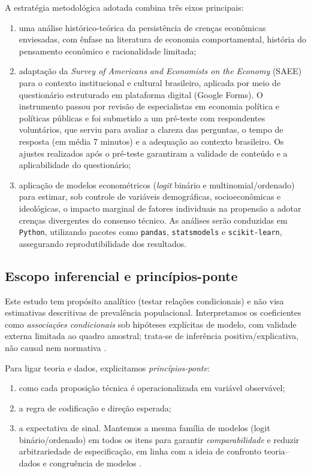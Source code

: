 A estratégia metodológica adotada combina três eixos principais:
\begin{enumerate}[label=\alph*)]
    \item uma análise histórico-teórica da persistência de crenças econômicas enviesadas, com ênfase na literatura de economia comportamental, história do pensamento econômico e racionalidade limitada;
    \item adaptação da \textit{Survey of Americans and Economists on the Economy} (SAEE) para o contexto institucional e cultural brasileiro, aplicada por meio de questionário estruturado em plataforma digital (Google Forms). O instrumento passou por revisão de especialistas em economia política e políticas públicas e foi submetido a um pré-teste com respondentes voluntários, que serviu para avaliar a clareza das perguntas, o tempo de resposta (em média 7 minutos) e a adequação ao contexto brasileiro. Os ajustes realizados após o pré-teste garantiram a validade de conteúdo e a aplicabilidade do questionário;
    \item aplicação de modelos econométricos (\textit{logit} binário e multinomial/ordenado) para estimar, sob controle de variáveis demográficas, socioeconômicas e ideológicas, o impacto marginal de fatores individuais na propensão a adotar crenças divergentes do consenso técnico. As análises serão conduzidas em \texttt{Python}, utilizando pacotes como \texttt{pandas}, \texttt{statsmodels} e \texttt{scikit-learn}, assegurando reprodutibilidade dos resultados.
\end{enumerate}

\subsection{Escopo inferencial e princípios-ponte}\label{sec:escopo-inferencial}

Este estudo tem propósito analítico (testar relações condicionais) e não visa estimativas descritivas de prevalência populacional. Interpretamos os coeficientes como \textit{associações condicionais} sob hipóteses explícitas de modelo, com validade externa limitada ao quadro amostral; trata-se de inferência positiva/explicativa, não causal nem normativa \cite{hausman2008}.

Para ligar teoria e dados, explicitamos \textit{princípios-ponte}:

\begin{enumerate}[label=\roman*)]
    \item como cada proposição técnica é operacionalizada em variável observável;
    \item a regra de codificação e direção esperada;
    \item a expectativa de sinal. Mantemos a mesma família de modelos (logit binário/ordenado) em todos os itens para garantir \textit{comparabilidade} e reduzir arbitrariedade de especificação, em linha com a ideia de confronto teoria–dados e congruência de modelos \cite{stigum2003}.
\end{enumerate}

